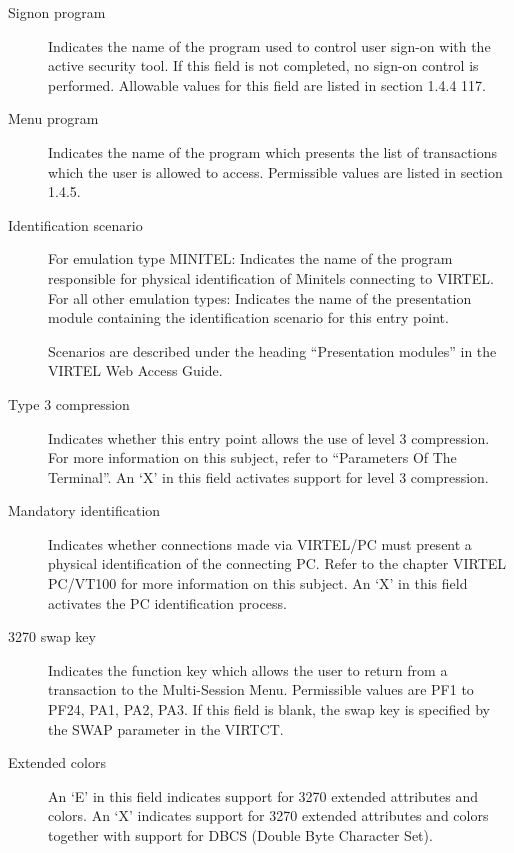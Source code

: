 \documentclass[letterpaper,10pt,english]{sphinxmanual}
\begin{document}
\begin{description}
\item[{Signon program}] \leavevmode
Indicates the name of the program used to control user sign-on with the active security tool. If this field is not completed, no sign-on control is performed. Allowable values for this field are listed in section 1.4.4 117.

\item[{Menu program}] \leavevmode
Indicates the name of the program which presents the list of transactions which the user is allowed to access. Permissible values are listed in section 1.4.5.

\item[{Identification scenario}] \leavevmode
For emulation type MINITEL: Indicates the name of the program responsible for physical identification of Minitels connecting to VIRTEL. For all other emulation types: Indicates the name of the presentation module containing the identification scenario for this entry point.

Scenarios are described under the heading “Presentation modules” in the VIRTEL Web Access Guide.

\item[{Type 3 compression}] \leavevmode
Indicates whether this entry point allows the use of level 3 compression. For more information on this subject, refer to “Parameters Of The Terminal”. An ‘X’ in this field activates support for level 3 compression.

\item[{Mandatory identification}] \leavevmode
Indicates whether connections made via VIRTEL/PC must present a physical identification of the connecting PC. Refer to the chapter VIRTEL PC/VT100 for more information on this subject. An ‘X’ in this field activates the PC identification process.

\item[{3270 swap key}] \leavevmode
Indicates the function key which allows the user to return from a transaction to the Multi-Session Menu. Permissible values are PF1 to PF24, PA1, PA2, PA3. If this field is blank, the swap key is specified by the SWAP parameter in the VIRTCT.

\item[{Extended colors}] \leavevmode
An ‘E’ in this field indicates support for 3270 extended attributes and colors. An ‘X’ indicates support for 3270 extended attributes and colors together with support for DBCS (Double Byte Character Set).

\end{description}
\end{document}
